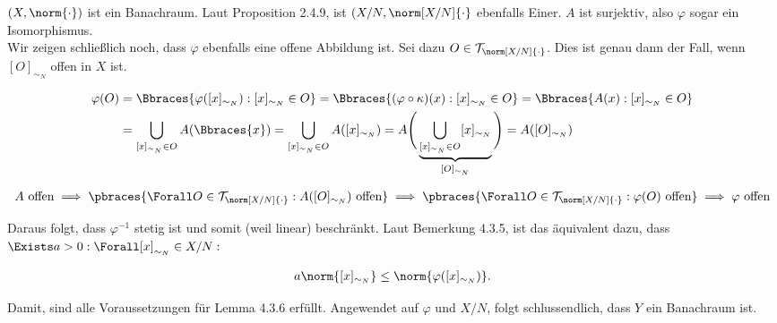 \begin{solution}
\begin{enumerate}[label = (\roman*)]
  $(X, \norm{\cdot})$ ist ein Banachraum.
  Laut Proposition 2.4.9, ist $(X/N, \norm[X/N]{\cdot}$ ebenfalls Einer.
  $A$ ist surjektiv, also $\varphi$ sogar ein Isomorphismus. \\

  Wir zeigen schließlich noch, dass $\varphi$ ebenfalls eine offene Abbildung ist.
  Sei dazu $O \in \mathcal{T}_{\norm[X/N]{\cdot}}$.
  Dies ist genau dann der Fall, wenn $[O]_{\sim_N}$ offen in $X$ ist.

  \begin{align*}
    \varphi(O)
    & =
    \Bbraces
    {
      \varphi([x]_{\sim_N}):
      [x]_{\sim_N} \in O
    }
    =
    \Bbraces
    {
      (\varphi \circ \kappa)(x):
      [x]_{\sim_N} \in O
    }
    =
    \Bbraces
    {
      A(x):
      [x]_{\sim_N} \in O
    } \\
    & =
    \bigcup_{[x]_{\sim_N} \in O}
    A(\Bbraces{x})
    =
    \bigcup_{[x]_{\sim_N} \in O}
    A([x]_{\sim_N})
    =
    A \Bigg
    (
      \underbrace
      {
        \bigcup_{[x]_{\sim_N} \in O}
        [x]_{\sim_N}
      }_{
        [O]_{\sim_N}
      }
    \Bigg)
    =
    A([O]_{\sim_N})
  \end{align*}

  \begin{align*}
    A ~\text{offen}
    \implies
    \pbraces
    {
      \Forall O \in \mathcal{T}_{\norm[X/N]{\cdot}}:
      A([O]_{\sim_N}) ~\text{offen}
    }
    \implies
    \pbraces
    {
      \Forall O \in \mathcal{T}_{\norm[X/N]{\cdot}}:
      \varphi(O) ~\text{offen}
    }
    \implies
    \varphi ~\text{offen}
  \end{align*}

  Daraus folgt, dass $\varphi^{-1}$ stetig ist und somit (weil linear) beschränkt.
  Laut Bemerkung 4.3.5, ist das äquivalent dazu, dass $\Exists a > 0: \Forall [x]_{\sim_N} \in X/N:$

  \begin{align*}
    a \norm{[x]_{\sim_N}}
    \leq
    \norm{\varphi([x]_{\sim_N})}.
  \end{align*}

  Damit, sind alle Voraussetzungen für Lemma 4.3.6 erfüllt.
  Angewendet auf $\varphi$ und $X/N$, folgt schlussendlich, dass $Y$ ein Banachraum ist.

\end{enumerate}

\end{solution}
